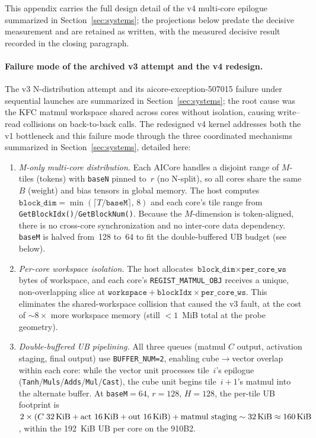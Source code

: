 This appendix carries the full design detail of the v4 multi-core
epilogue summarized in Section~\ref{sec:systems}; the projections below
predate the decisive measurement and are retained as written, with the
measured decisive result recorded in the closing paragraph.

\paragraph{Failure mode of the archived v3 attempt and the v4 redesign.}
The v3 N-distribution attempt and its aicore-exception-507015 failure
under sequential launches are summarized in Section~\ref{sec:systems};
the root cause was the KFC matmul workspace shared across cores without
isolation, causing write--read collisions on back-to-back calls.  The
redesigned v4 kernel addresses both the v1 bottleneck and this failure
mode through the three coordinated mechanisms summarized in
Section~\ref{sec:systems}, detailed here:

\begin{enumerate}
  \item \emph{M-only multi-core distribution.}  Each AICore handles a
    disjoint range of $M$-tiles (tokens) with \texttt{baseN} pinned to~$r$
    (no N-split), so all cores share the same $B$ (weight) and bias tensors
    in global memory.  The host computes
    $\texttt{block\_dim}=\min(\lceil T/\texttt{baseM}\rceil,\,8)$ and each
    core's tile range from \texttt{GetBlockIdx()}/\texttt{GetBlockNum()}.
    Because the $M$-dimension is token-aligned, there is no cross-core
    synchronization and no inter-core data dependency.  \texttt{baseM} is
    halved from~128 to~64 to fit the double-buffered UB budget (see below).

  \item \emph{Per-core workspace isolation.}  The host allocates
    $\texttt{block\_dim}\times\texttt{per\_core\_ws}$ bytes of workspace,
    and each core's \texttt{REGIST\_MATMUL\_OBJ} receives a unique,
    non-overlapping slice at $\texttt{workspace}+\texttt{blockIdx}\times
    \texttt{per\_core\_ws}$.  This eliminates the shared-workspace
    collision that caused the v3 fault, at the cost of ${\sim}8\times$ more
    workspace memory (still $<\!1$~MiB total at the probe geometry).

  \item \emph{Double-buffered UB pipelining.}  All three queues (matmul
    $C$ output, activation staging, final output) use
    \texttt{BUFFER\_NUM=2}, enabling cube$\to$vector overlap within each
    core: while the vector unit processes tile~$i$'s epilogue
    (\texttt{Tanh}/\texttt{Muls}/\texttt{Adds}/\texttt{Mul}/\texttt{Cast}),
    the cube unit begins tile~$i{+}1$'s matmul into the alternate buffer.
    At \texttt{baseM}$=64$, $r=128$, $H=128$, the per-tile UB footprint is
    $2\times(C\;\text{32\,KiB}+\text{act 16\,KiB}+\text{out 16\,KiB})
    +\text{matmul staging}\sim\text{32\,KiB}\approx\text{160\,KiB}$,
    within the 192~KiB UB per core on the 910B2.
\end{enumerate}

